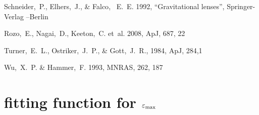 \documentclass[useAMS,usenatbib]{mn2e}
\newcommand{\mnras}{MNRAS}
\newcommand{\apj}{ApJ}
\begin{document}
\begin{thebibliography}{99}
 {Schneider},~P., {Elhers},~J., \& {Falco}, ~E.~E. 1992, ``Gravitational lenses'', Springer-Verlag --Berlin

 {Rozo},~E., {Nagai},~D., {Keeton},~C. {et~al.} 2008, \apj,  687, 22

 Turner,~E.~L., Ostriker,~J.~P., \& Gott,~J.~R., 1984, \apj, 284,1

 {Wu},~X.~P. \& {Hammer},~F. 1993, \mnras, 262, 187

\end{thebibliography}

\appendix

\section[]{\lowercase{Fitting function for} \mbox{{\boldmath $\varepsilon_{\rm max}$}} }

\label{lastpage}
\end{document}
